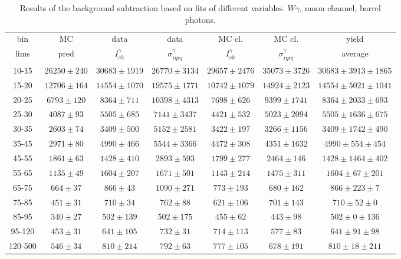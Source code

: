 \begin{table}[h]
  \tiny
  \begin{center}
  \caption{Results of the background subtraction based on fits of different variables. $W\gamma$, muon channel, barrel photons.}
  \begin{tabular}{|c|c|c|c|c|c|c|}
    bin &  MC   & data  & data  & MC cl. & MC cl. & yield\\ 
    lims & pred & $I_{ch}^{\gamma}$ & $\sigma_{i\eta i\eta}^\gamma$  & $I_{ch}^{\gamma}$  & $\sigma_{i\eta i\eta}^\gamma$   & average \\ \hline
    10-15 & $26250\pm240$ & $30683\pm1919$ & $26770\pm3134$ & $29657\pm2476$ & $35073\pm3726$ &$30683\pm3913\pm1865$  \\ \hline
    15-20 & $12706\pm164$ & $14554\pm1070$ & $19575\pm1771$ & $10742\pm1079$ & $14924\pm2123$ &$14554\pm5021\pm1041$  \\ \hline
    20-25 & $6793\pm120$ & $8364\pm711$ & $10398\pm4313$ & $7698\pm626$ & $9399\pm1741$ &$8364\pm2033\pm693$  \\ \hline
    25-30 & $4087\pm93$ & $5505\pm685$ & $7141\pm3437$ & $4421\pm532$ & $5023\pm2094$ &$5505\pm1636\pm675$  \\ \hline
    30-35 & $2603\pm74$ & $3409\pm500$ & $5152\pm2581$ & $3422\pm197$ & $3266\pm1156$ &$3409\pm1742\pm490$  \\ \hline
    35-45 & $2971\pm80$ & $4990\pm466$ & $5544\pm3366$ & $4472\pm308$ & $4351\pm1632$ &$4990\pm554\pm454$  \\ \hline
    45-55 & $1861\pm63$ & $1428\pm410$ & $2893\pm593$ & $1799\pm277$ & $2464\pm146$ &$1428\pm1464\pm402$  \\ \hline
    55-65 & $1135\pm49$ & $1604\pm207$ & $1671\pm501$ & $1143\pm214$ & $1475\pm311$ &$1604\pm67\pm201$  \\ \hline
    65-75 & $664\pm37$ & $866\pm43$ & $1090\pm271$ & $773\pm193$ & $680\pm162$ &$866\pm223\pm7$  \\ \hline
    75-85 & $451\pm31$ & $710\pm34$ & $762\pm88$ & $621\pm106$ & $701\pm143$ &$710\pm52\pm0$  \\ \hline
    85-95 & $340\pm27$ & $502\pm139$ & $502\pm175$ & $455\pm62$ & $443\pm98$ &$502\pm0\pm136$  \\ \hline
    95-120 & $453\pm31$ & $641\pm105$ & $732\pm31$ & $714\pm113$ & $577\pm83$ &$641\pm91\pm98$  \\ \hline
    120-500 & $546\pm34$ & $810\pm214$ & $792\pm63$ & $777\pm105$ & $678\pm191$ &$810\pm18\pm211$  \\ \hline
  \end{tabular}
  \label{tab:diff_ways_to_fit_phoEt_BARREL_muon}
  \end{center}
\end{table}

